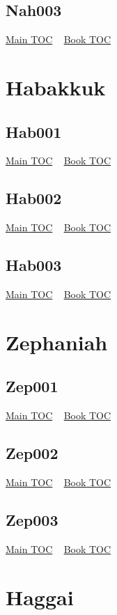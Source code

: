 \documentclass{book}
\begin{document}
  \section{Nah003}\hyperlink{toc}{Main TOC} ~ \hyperref[subsec:Nah]{Book TOC} 
  \chapter{Habakkuk} \label{subsec:Hab} \begin{multicols}{2} \minitoc \end{multicols}
  \section{Hab001}\hyperlink{toc}{Main TOC} ~ \hyperref[subsec:Hab]{Book TOC} 
  \section{Hab002}\hyperlink{toc}{Main TOC} ~ \hyperref[subsec:Hab]{Book TOC} 
  \section{Hab003}\hyperlink{toc}{Main TOC} ~ \hyperref[subsec:Hab]{Book TOC} 
  \chapter{Zephaniah} \label{subsec:Zep} \begin{multicols}{2} \minitoc \end{multicols}
  \section{Zep001}\hyperlink{toc}{Main TOC} ~ \hyperref[subsec:Zep]{Book TOC} 
  \section{Zep002}\hyperlink{toc}{Main TOC} ~ \hyperref[subsec:Zep]{Book TOC} 
  \section{Zep003}\hyperlink{toc}{Main TOC} ~ \hyperref[subsec:Zep]{Book TOC} 
  \chapter{Haggai} \label{subsec:Hag} \begin{multicols}{2} \minitoc \end{multicols}
\end{document}
